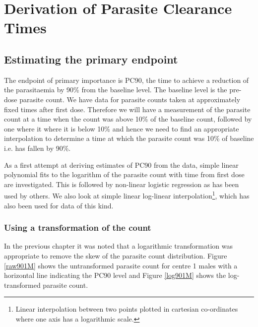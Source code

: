 \chapter{Derivation of Parasite Clearance Times}
\section{Estimating the primary endpoint}
The endpoint of primary importance is PC90, the time to achieve a reduction of the parasitaemia by 90\% from the baseline level. The baseline level is the pre-dose parasite count. We have data for parasite counts taken at approximately fixed times after first dose. Therefore we will have a measurement of the parasite count at a time when the count was above 10\% of the baseline count, followed by one where it where it is below 10\% and hence we need to find an appropriate interpolation to determine a time at which the parasite count was 10\% of baseline i.e. has fallen by 90\%.

As a first attempt at deriving estimates of PC90 from the data, simple linear polynomial fits to the logarithm of the parasite count with time from first dose are investigated. This is followed by non-linear logistic regression as has been used by others\cite{wootton}. We also look at simple linear log-linear interpolation\footnote{Linear interpolation between two points plotted in cartesian co-ordinates where one axis has a logarithmic scale.}, which has also been used for data of this kind\cite{carmello}.
\subsection{Using a transformation of the count}
In the previous chapter it was noted that a logarithmic transformation was appropriate to remove the skew of the parasite count distribution. Figure \ref{raw901M} shows the untransformed parasite count for centre 1 males with a horizontal line indicating the PC90 level and Figure \ref{log901M} shows the log-transformed parasite count.

